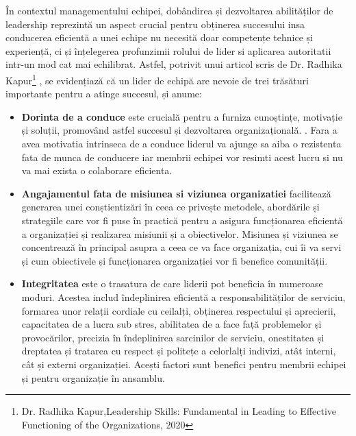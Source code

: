 \documentclass[a4paper, 12pt]{article}
\begin{document}
	\quad În contextul managementului echipei, dobândirea și dezvoltarea abilităților de leadership reprezintă un aspect crucial pentru obținerea succesului insa conducerea eficientă a unei echipe nu necesită doar competențe tehnice și experiență, ci și înțelegerea profunzimii rolului de lider si aplicarea autoritatii intr-un mod cat mai echilibrat. Astfel, potrivit unui articol scris de Dr. Radhika Kapur\footnote{Dr. Radhika Kapur,Leadership Skills: Fundamental in Leading to Effective Functioning of the Organizations, 2020} , se evidențiază că un lider de echipă are nevoie de trei trăsături importante pentru a atinge succesul, și anume:

	\begin{itemize}
	\item \textbf {Dorinta de a conduce} este crucială pentru a furniza cunoștințe, motivație și soluții, promovând astfel succesul și dezvoltarea organizațională. . Fara a avea motivatia intrinseca de a conduce liderul va ajunge sa aiba o rezistenta fata de munca de conducere iar membrii echipei vor resimti acest lucru si nu va mai exista o colaborare eficienta.

	 \item \textbf{Angajamentul fata de misiunea si viziunea organizatiei} facilitează generarea unei conștientizări în ceea ce privește metodele, abordările și strategiile care vor fi puse în practică pentru a asigura funcționarea eficientă a organizației și realizarea misiunii și a obiectivelor. Misiunea și viziunea se concentrează în principal asupra a ceea ce va face organizația, cui îi va servi și cum obiectivele și funcționarea organizației vor fi benefice comunității. 

	 \item\textbf{Integritatea} este o trasatura de care liderii pot beneficia în numeroase moduri. Acestea includ îndeplinirea eficientă a responsabilităților de serviciu, formarea unor relații cordiale cu ceilalți, obținerea respectului și aprecierii, capacitatea de a lucra sub stres, abilitatea de a face față problemelor și provocărilor, precizia în îndeplinirea sarcinilor de serviciu, onestitatea și dreptatea și tratarea cu respect și politețe a celorlalți indivizi, atât interni, cât și externi organizației. Acești factori sunt benefici pentru membrii echipei și pentru organizație în ansamblu. 

\end{itemize}
\end{document}
